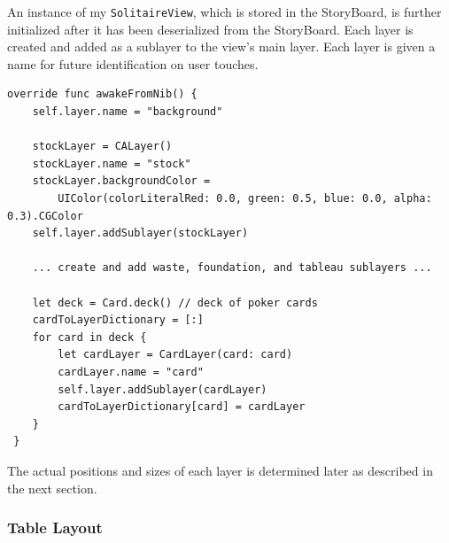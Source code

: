 \documentclass[11pt]{article}
\begin{document}
An instance of my {\tt SolitaireView}, which is stored in the StoryBoard, is
further initialized after it has been deserialized from the StoryBoard.
Each layer is created and added as a sublayer to the view's main layer.
Each layer is given a name for future identification on user touches.
\begin{verbatim}
override func awakeFromNib() {
    self.layer.name = "background"
      
    stockLayer = CALayer()
    stockLayer.name = "stock"
    stockLayer.backgroundColor = 
        UIColor(colorLiteralRed: 0.0, green: 0.5, blue: 0.0, alpha: 0.3).CGColor
    self.layer.addSublayer(stockLayer)
    
    ... create and add waste, foundation, and tableau sublayers ...
    
    let deck = Card.deck() // deck of poker cards
    cardToLayerDictionary = [:]
    for card in deck {
        let cardLayer = CardLayer(card: card)
        cardLayer.name = "card"
        self.layer.addSublayer(cardLayer)
        cardToLayerDictionary[card] = cardLayer
    }
 }
\end{verbatim}
The actual positions and sizes of each layer is determined later
as described in the next section.

\subsubsection{Table Layout}
\end{document}
